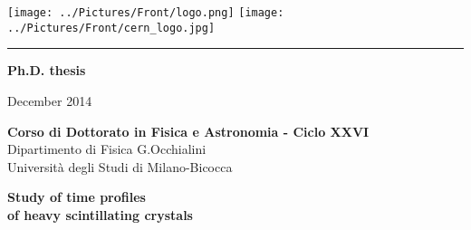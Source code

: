 
\front

\linespread{1.5}                        %
\pagestyle{empty}

\begin{center}
\par
\vspace{6pt}
\texttt{[image: ../Pictures/Front/logo.png]} \hspace{0.5\textwidth}
\texttt{[image: ../Pictures/Front/cern\_logo.jpg]}\\
\par
\vspace{10pt}
\hrule 
\par
\vspace{18pt}
\par
\begin{large}\textbf{Ph.D. thesis}\\
\par
\vspace{2pt}
\par
December 2014 \\ 
\par
\vspace{8pt}
\par
\end{large} 
\begin{Large}
{\bf Corso di Dottorato in Fisica e Astronomia - Ciclo XXVI}\\
\vspace{-5pt}
Dipartimento di Fisica G.Occhialini\\
\vspace{-10pt}
Universit\`a degli Studi di Milano-Bicocca\\
\vspace{-10pt}
\end{Large}
\vspace{80pt}
{\huge \bfseries Study of time profiles} \\
\vspace{6pt}
{\huge \bfseries of heavy scintillating crystals} \\ 
\vspace{6pt}

\end{center}
